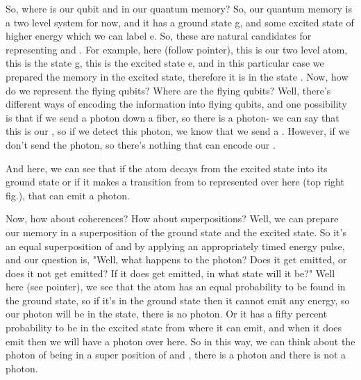 So, where is our qubit  and  in our quantum memory? So, our quantum memory is a two level system for now, and it has a ground state g, and some excited state of higher energy which we can label e. So, these are natural candidates for representing  and . For example, here (follow pointer), this is our two level atom, this is the state g, this is the excited state e, and in this particular case we prepared the memory in the excited state, therefore it is in the state . Now, how do we represent the flying qubits? Where are the flying qubits? Well, there's different ways of encoding the information into flying qubits, and one possibility is that if we send a photon down a fiber, so there is a photon- we can say that this is our , so if we detect this photon, we know that we send a . However, if we don't send the photon, so there's nothing that can encode our .

And here, we can see that if the atom decays from the excited state into its ground state or if it makes a transition from  to  represented over here (top right fig.), that can emit a photon.

Now, how about coherences? How about superpositions? Well, we can prepare our memory in a superposition of the ground state and the excited state. So it's an equal superposition of  and  by applying an appropriately timed energy pulse, and our question is, "Well, what happens to the photon? Does it get emitted, or does it not get emitted? If it does get emitted, in what state will it be?" Well here (see pointer), we see that the atom has an equal probability to be found in the ground state, so if it's in the ground state then it cannot emit any energy, so our photon will be in the  state, there is no photon. Or it has a fifty percent probability to be in the excited state from where it can emit, and when it does emit then we will have a photon over here. So in this way, we can think about the photon of being in a super position of  and , there is a photon and there is not a photon.

